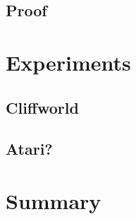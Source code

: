 %
%
%
%


\subsection{Proof}




\section{Experiments}\label{sec:vi-experiments}
\subsection{Cliffworld}

\subsection{Atari?}

\section{Summary}


